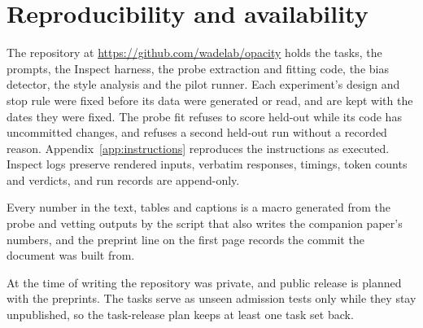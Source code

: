 \section{Reproducibility and availability}
\label{sec:reproducibility}

The repository at \url{https://github.com/wadelab/opacity} holds the tasks, the prompts, the Inspect harness, the probe extraction and fitting code, the bias detector, the style analysis and the pilot runner. Each experiment's design and stop rule were fixed before its data were generated or read, and are kept with the dates they were fixed. The probe fit refuses to score held-out while its code has uncommitted changes, and refuses a second held-out run without a recorded reason. Appendix~\ref{app:instructions} reproduces the instructions as executed. Inspect logs preserve rendered inputs, verbatim responses, timings, token counts and verdicts, and run records are append-only.

Every number in the text, tables and captions is a macro generated from the probe and vetting outputs by the script that also writes the companion paper's numbers, and the preprint line on the first page records the commit the document was built from.

At the time of writing the repository was private, and public release is planned with the preprints. The tasks serve as unseen admission tests only while they stay unpublished, so the task-release plan keeps at least one task set back.
